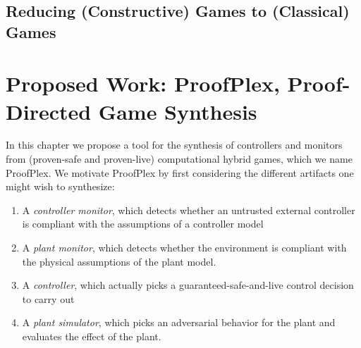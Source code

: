 \documentclass[12pt]{cmuthesis}
\theoremstyle{definition}
\theoremstyle{remark}
\newcommand{\ProofPlex}{ProofPlex\xspace}
\begin{document}
\section{Reducing (Constructive) Games to (Classical) Games}


\chapter{Proposed Work: \ProofPlex, Proof-Directed Game Synthesis}
\label{ch:proofplex}
In this chapter we propose a tool for the synthesis of controllers and monitors from (proven-safe and proven-live) computational hybrid games, which we name \ProofPlex.
We motivate \ProofPlex by first considering the different artifacts one might wish to synthesize:
\begin{enumerate}
\item A \emph{controller monitor}, which detects whether an untrusted external controller is compliant with the assumptions of a controller model
\item A \emph{plant monitor}, which detects whether the environment is compliant with the physical assumptions of the plant model.
\item A \emph{controller}, which actually picks a guaranteed-safe-and-live control decision to carry out
\item A \emph{plant simulator}, which picks an adversarial behavior for the plant and evaluates the effect of the plant.
\end{enumerate}
\end{document}
